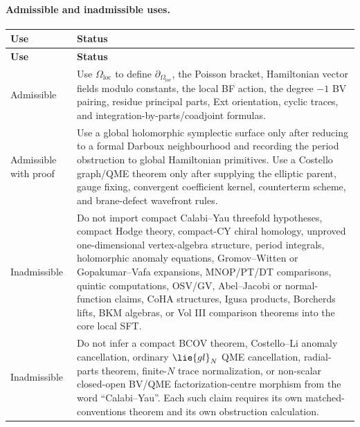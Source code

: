 \paragraph{Admissible and inadmissible uses.}
\begin{longtable}{@{}>{\raggedright\arraybackslash}p{}
  >{\raggedright\arraybackslash}p{}@{}}
\hline
\textbf{Use} & \textbf{Status}\\
\hline
\endfirsthead
\hline
\textbf{Use} & \textbf{Status}\\
\hline
\endhead
Admissible &
Use \(\Omega_{\mathrm{loc}}\) to define
\(\partial_{\Omega_{\mathrm{loc}}}\), the Poisson bracket, Hamiltonian
vector fields modulo constants, the local BF action, the degree \(-1\)
BV pairing, residue principal parts, Ext orientation, cyclic traces, and
integration-by-parts/coadjoint formulas.\\
\hline
Admissible with proof &
Use a global holomorphic symplectic surface only after reducing to a
formal Darboux neighbourhood and recording the period obstruction to
global Hamiltonian primitives.  Use a Costello graph/QME theorem only
after supplying the elliptic parent, gauge fixing, convergent coefficient
kernel, counterterm scheme, and brane-defect wavefront rules.\\
\hline
Inadmissible &
Do not import compact Calabi--Yau threefold hypotheses, compact Hodge
theory, compact-CY chiral homology, unproved one-dimensional
vertex-algebra structure, period integrals, holomorphic anomaly equations,
Gromov--Witten or Gopakumar--Vafa expansions, MNOP/PT/DT comparisons,
quintic computations, OSV/GV, Abel--Jacobi or normal-function claims,
CoHA structures, Igusa products, Borcherds lifts, BKM algebras, or Vol
III comparison theorems into the core local SFT.\\
\hline
Inadmissible &
Do not infer a compact BCOV theorem, Costello--Li anomaly cancellation,
ordinary \(\lie{gl}_N\) QME cancellation, radial-parts theorem,
finite-\(N\) trace normalization, or non-scalar closed-open BV/QME
factorization-centre morphism from the word ``Calabi--Yau''.  Each such
claim requires its own matched-conventions theorem and its own
obstruction calculation.\\
\hline
\end{longtable}

